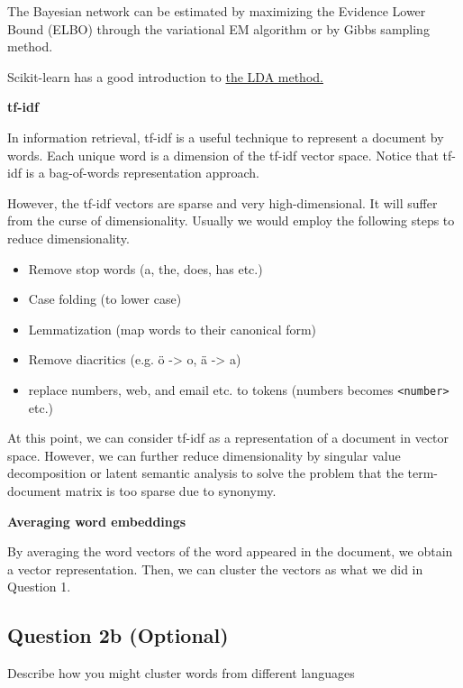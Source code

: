 \documentclass{kthreport}
\begin{document}
The Bayesian network can be estimated by maximizing the Evidence Lower Bound
(ELBO) through the variational EM algorithm or by Gibbs sampling method.

Scikit-learn has a good introduction to
\href{https://scikit-learn.org/stable/modules/decomposition.html#latentdirichletallocation}{the LDA method.}

\textbf{tf-idf}

In information retrieval, tf-idf is a useful technique to represent a document by
words. Each unique word is a dimension of the tf-idf vector space.
Notice that tf-idf is a bag-of-words representation approach.

However, the tf-idf vectors are sparse and very high-dimensional. It will suffer from
the curse of dimensionality. Usually we would employ the following steps to
reduce dimensionality.

\begin{itemize}
    \item Remove stop words (a, the, does, has etc.)
    \item Case folding (to lower case)
    \item Lemmatization (map words to their canonical form)
    \item Remove diacritics (e.g. ö -> o, ä -> a)
    \item replace numbers, web, and email etc. to tokens (numbers becomes \texttt{<number>} etc.)
\end{itemize}

At this point, we can consider tf-idf as a representation of a document in vector space.
However, we can further reduce dimensionality by singular value decomposition
or latent semantic analysis to solve the problem that the term-document matrix
is too sparse due to synonymy.

\textbf{Averaging word embeddings}

By averaging the word vectors of the word appeared in the document, we obtain a vector
representation. Then, we can cluster the vectors as what we did in Question 1.

\subsection{Question 2b (Optional)}
Describe how you might cluster words from different languages
\end{document}
